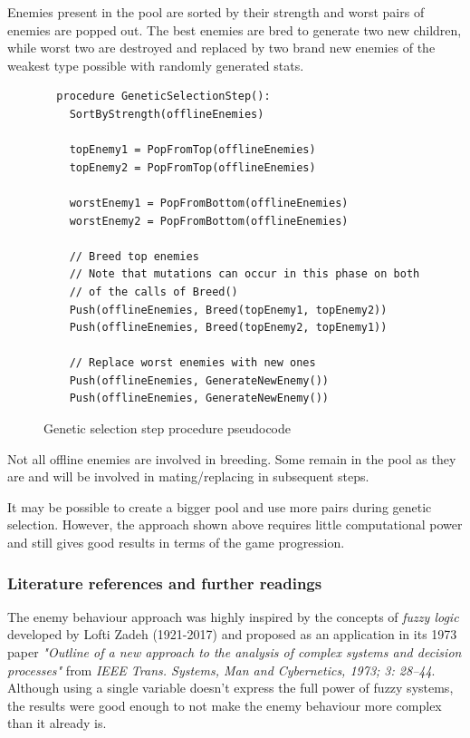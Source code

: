 \documentclass[11pt]{article}
\begin{document}
Enemies present in the pool are sorted by their strength and worst pairs of enemies are popped out. The best enemies are bred to generate two new children, while worst two are destroyed and replaced by two brand new enemies of the weakest type possible with randomly generated stats.

\begin{figure}[H]
  \begin{lstlisting}
  procedure GeneticSelectionStep():
    SortByStrength(offlineEnemies)

    topEnemy1 = PopFromTop(offlineEnemies)
    topEnemy2 = PopFromTop(offlineEnemies)

    worstEnemy1 = PopFromBottom(offlineEnemies)
    worstEnemy2 = PopFromBottom(offlineEnemies)

    // Breed top enemies
    // Note that mutations can occur in this phase on both
    // of the calls of Breed()
    Push(offlineEnemies, Breed(topEnemy1, topEnemy2))
    Push(offlineEnemies, Breed(topEnemy2, topEnemy1))

    // Replace worst enemies with new ones
    Push(offlineEnemies, GenerateNewEnemy())
    Push(offlineEnemies, GenerateNewEnemy())
  \end{lstlisting}
  \caption{Genetic selection step procedure pseudocode}
\end{figure}

Not all offline enemies are involved in breeding. Some remain in the pool as they are and will be involved in mating/replacing in subsequent steps.

It may be possible to create a bigger pool and use more pairs during genetic selection. However, the approach shown above requires little computational power and still gives good results in terms of the game progression.

\subsubsection{Literature references and further readings}

The enemy behaviour approach was highly inspired by the concepts of \textit{fuzzy logic} developed by Lofti Zadeh (1921-2017) and proposed as an application in its 1973 paper \textit{"Outline of a new approach to the analysis of complex systems and decision processes"} from \textit{IEEE Trans. Systems, Man and Cybernetics, 1973; 3: 28–44}. Although using a single variable doesn't express the full power of fuzzy systems, the results were good enough to not make the enemy behaviour more complex than it already is.
\end{document}
